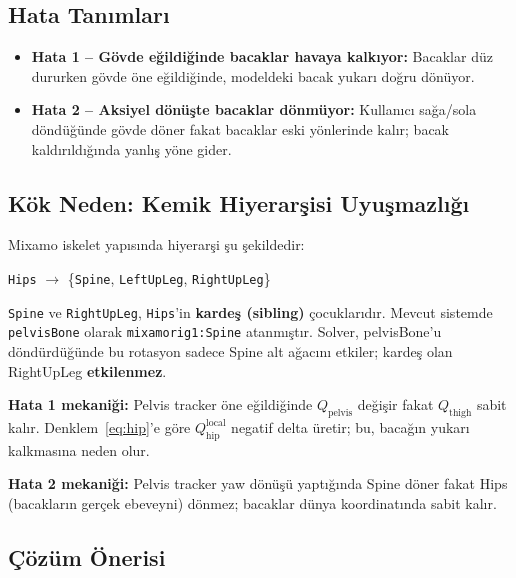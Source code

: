 \documentclass[11pt,a4paper]{article}
\begin{document}
\subsection{Hata Tan{\i}mlar{\i}}

\begin{itemize}[nosep]
    \item \textcolor{bugred}{\textbf{Hata 1 -- G\"ovde e\u{g}ildi\u{g}inde bacaklar havaya kalk{\i}yor:}}
    Bacaklar d\"uz dururken g\"ovde \"one e\u{g}ildi\u{g}inde, modeldeki bacak
    yukar{\i} do\u{g}ru d\"on\"uyor.
    \item \textcolor{bugred}{\textbf{Hata 2 -- Aksiyel d\"on\"u\c{s}te bacaklar d\"onm\"uyor:}}
    Kullan{\i}c{\i} sa\u{g}a/sola d\"ond\"u\u{g}\"unde g\"ovde d\"oner fakat bacaklar eski
    y\"onlerinde kal{\i}r; bacak kald{\i}r{\i}ld{\i}\u{g}{\i}nda yanl{\i}\c{s} y\"one gider.
\end{itemize}

\subsection{K\"ok Neden: Kemik Hiyerar\c{s}isi Uyu\c{s}mazl{\i}\u{g}{\i}}

Mixamo iskelet yap{\i}s{\i}nda hiyerar\c{s}i \c{s}u \c{s}ekildedir:

\begin{center}
\texttt{Hips} $\rightarrow$ \{\texttt{Spine},\; \texttt{LeftUpLeg},\;
\texttt{RightUpLeg}\}
\end{center}

\texttt{Spine} ve \texttt{RightUpLeg}, \texttt{Hips}'in \textbf{karde\c{s}
(sibling)} \c{c}ocuklar{\i}d{\i}r. Mevcut sistemde \texttt{pelvisBone} olarak
\texttt{mixamorig1:Spine} atanm{\i}\c{s}t{\i}r. Solver, pelvisBone'u
d\"ond\"urd\"u\u{g}\"unde bu rotasyon sadece Spine alt a\u{g}ac{\i}n{\i} etkiler;
karde\c{s} olan RightUpLeg \textbf{etkilenmez}.

\textbf{Hata 1 mekani\u{g}i:} Pelvis tracker \"one e\u{g}ildi\u{g}inde
$Q_{\text{pelvis}}$ de\u{g}i\c{s}ir fakat $Q_{\text{thigh}}$ sabit kal{\i}r.
Denklem~\ref{eq:hip}'e g\"ore $Q_{\text{hip}}^{\text{local}}$ negatif delta
\"uretir; bu, baca\u{g}{\i}n yukar{\i} kalkmas{\i}na neden olur.

\textbf{Hata 2 mekani\u{g}i:} Pelvis tracker yaw d\"on\"u\c{s}\"u yapt{\i}\u{g}{\i}nda
Spine d\"oner fakat Hips (bacaklar{\i}n ger\c{c}ek ebeveyni) d\"onmez;
bacaklar d\"unya koordinat{\i}nda sabit kal{\i}r.

\subsection{\c{C}\"oz\"um \"Onerisi}
\end{document}
